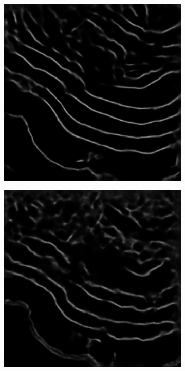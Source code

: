 \begin{figure}[!t]
    \centering
    \begin{subfigure}[t]{0.24\textwidth}
        \centering
        \includegraphics[width=1\textwidth, valign=c]{images/abl-none.png}
        \caption{}
    \end{subfigure}
    \begin{subfigure}[t]{0.24\textwidth}
        \centering
        \includegraphics[width=1\textwidth, valign=c]{images/abl-short.png}

\end{subfigure}
\end{figure}
